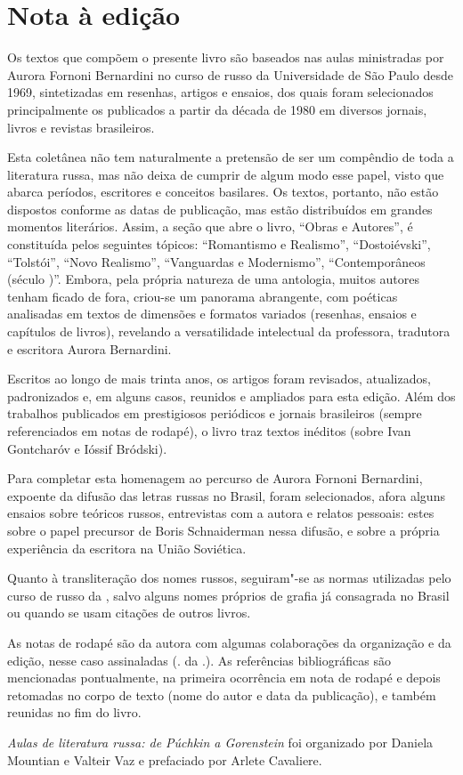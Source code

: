 \chapter{Nota à edição}
\label{nota}

Os textos que compõem o presente livro são baseados nas aulas
ministradas por Aurora Fornoni Bernardini no curso de russo da
Universidade de São Paulo desde 1969, sintetizadas em resenhas, artigos
e ensaios, dos quais foram selecionados principalmente os publicados a partir da década
de 1980 em diversos jornais, livros e revistas brasileiros.

Esta coletânea não tem naturalmente a pretensão de ser um compêndio de toda a
literatura russa, mas não deixa de cumprir de algum modo
esse papel, visto que abarca períodos, escritores e conceitos basilares. Os textos, portanto, não estão dispostos conforme as datas de publicação, mas estão distribuídos em grandes momentos
literários. Assim, a seção que abre o livro, ``Obras e Autores'', é
constituída pelos seguintes tópicos: ``Romantismo e Realismo'',
``Dostoiévski'', ``Tolstói'', ``Novo Realismo'', ``Vanguardas e
Modernismo'', ``Contemporâneos (século \scalebox{0.8}{XX})''. Embora, pela própria
natureza de uma antologia, muitos autores tenham ficado de fora,
criou-se um panorama abrangente, com poéticas analisadas em textos de
dimensões e formatos variados (resenhas, ensaios e capítulos de livros),
revelando a versatilidade intelectual da professora, tradutora e
escritora Aurora Bernardini.

Escritos ao longo de mais trinta anos, os artigos foram revisados,
atualizados, padronizados e, em alguns casos, reunidos e ampliados para
esta edição. Além dos trabalhos publicados em prestigiosos periódicos e
jornais brasileiros (sempre referenciados em notas de rodapé), o livro
traz textos inéditos (sobre Ivan Gontcharóv e Ióssif Bródski).

Para completar esta homenagem ao percurso de Aurora Fornoni Bernardini,
expoente da difusão das letras russas no Brasil, foram selecionados,
afora alguns ensaios sobre teóricos russos, entrevistas com a autora e
relatos pessoais: estes sobre o papel precursor de Boris Schnaiderman nessa
difusão, e sobre a própria experiência da escritora na União Soviética.

Quanto à transliteração dos nomes russos, seguiram"-se as normas
utilizadas pelo curso de russo da \scalebox{0.8}{USP}, salvo alguns nomes próprios de
grafia já consagrada no Brasil ou quando se usam citações de outros livros.

As notas de rodapé são da autora com algumas colaborações da organização
e da edição, nesse caso assinaladas (\scalebox{0.8}{N}. da \scalebox{0.8}{E}.). As referências
bibliográficas são mencionadas pontualmente, na primeira ocorrência em
nota de rodapé e depois retomadas no corpo de texto (nome do autor e
data da publicação), e também reunidas no fim do livro.

\emph{Aulas de literatura russa: de Púchkin a Gorenstein} foi
organizado por Daniela Mountian e Valteir Vaz e prefaciado por Arlete Cavaliere.
